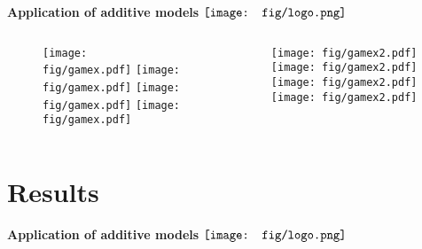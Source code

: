 \documentclass{beamer}
\begin{document}
\begin{frame}{\textbf{Application of additive models} \hspace{0pt plus 1 filll} $\vcenter{\hbox{\texttt{[image: fig/logo.png]}}}$}
\begin{columns}
\begin{column}{0.5\textwidth}
\begin{figure}
\begin{overprint}
\texttt{[image: fig/gamex.pdf]}
\texttt{[image: fig/gamex.pdf]}
\texttt{[image: fig/gamex.pdf]}
\texttt{[image: fig/gamex.pdf]}
\end{overprint}
\end{figure}
\end{column}
\begin{column}{0.5\textwidth}
\begin{figure}
\begin{overprint}
\texttt{[image: fig/gamex2.pdf]}
\texttt{[image: fig/gamex2.pdf]}
\texttt{[image: fig/gamex2.pdf]}
\texttt{[image: fig/gamex2.pdf]}
\end{overprint}
\end{figure}
\end{column}
\end{columns}
\end{frame}

\section{Results}

\begin{frame}{\textbf{Application of additive models} \hspace{0pt plus 1 filll} $\vcenter{\hbox{\texttt{[image: fig/logo.png]}}}$}
\vspace{-0.2in}
\begin{center}
\end{center}
\end{frame}
\end{document}
